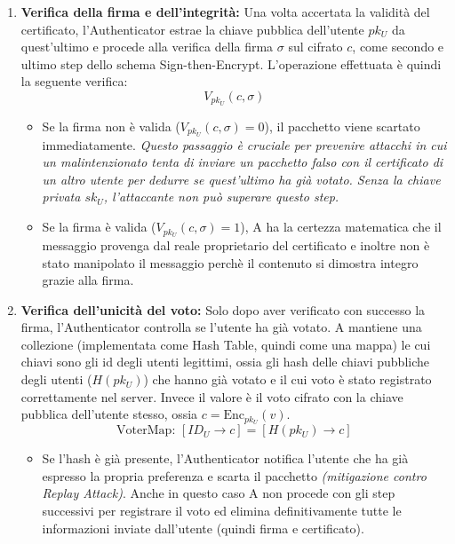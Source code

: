 \begin{enumerate}
			\item \textbf{Verifica della firma e dell'integrità:} Una volta accertata la validità del certificato, l'Authenticator estrae la chiave pubblica dell'utente $pk_U$ da quest'ultimo e procede alla verifica della firma $\sigma$ sul cifrato $c$, come secondo e ultimo step dello schema Sign-then-Encrypt. L'operazione effettuata è quindi la seguente verifica:
			$$V_{pk_U}(c, \sigma)$$
			\begin{itemize}
				\item Se la firma non è valida ($V_{pk_U}(c, \sigma)=0$), il pacchetto viene scartato immediatamente. \textit{Questo passaggio è cruciale per prevenire attacchi in cui un malintenzionato tenta di inviare un pacchetto falso con il certificato di un altro utente per dedurre se quest'ultimo ha già votato. Senza la chiave privata $sk_U$, l'attaccante non può superare questo step.}
				
				\item Se la firma è valida ($V_{pk_U}(c, \sigma)=1$), A ha la certezza matematica che il messaggio provenga dal reale proprietario del certificato e inoltre non è stato manipolato il messaggio perchè il contenuto si dimostra integro grazie alla firma.
			\end{itemize}
			
			\item \textbf{Verifica dell'unicità del voto:} Solo dopo aver verificato con successo la firma, l'Authenticator controlla se l'utente ha già votato. A mantiene una collezione (implementata come Hash Table, quindi come una mappa) le cui chiavi sono gli id degli utenti legittimi, ossia gli hash delle chiavi pubbliche degli utenti ($H(pk_U)$) che hanno già votato e il cui voto è stato registrato correttamente nel server. Invece il valore è il voto cifrato con la chiave pubblica dell'utente stesso, ossia $c=\text{Enc}_{pk_U}(v)$.
			$$ \text{VoterMap: } [ID_U \to c] = [H(pk_U) \to c]$$
			\begin{itemize}
				\item Se l'hash è già presente, l'Authenticator notifica l'utente che ha già espresso la propria preferenza e scarta il pacchetto \textit{(mitigazione contro Replay Attack)}. Anche in questo caso A non procede con gli step successivi per registrare il voto ed elimina definitivamente tutte le informazioni inviate dall'utente (quindi firma e certificato).
				

\end{itemize}
\end{enumerate}
